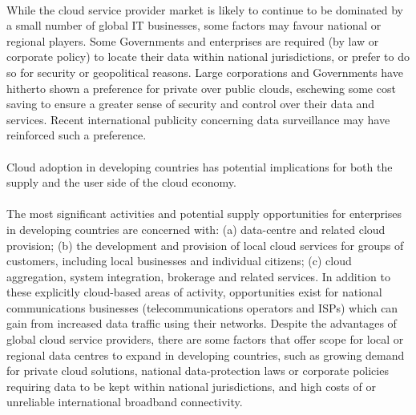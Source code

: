 \documentclass[a4paper, UTF8, 12pt]{article}
\begin{document}
\paragraph*{}
    While the cloud service provider market is likely to continue to be dominated by a small number of global IT businesses, some factors may favour national or regional players. Some Governments and enterprises are required (by law or corporate policy) to locate their data within national jurisdictions, or prefer to do so for security or geopolitical reasons. Large corporations and Governments have hitherto shown a preference for private over public clouds, eschewing some cost saving to ensure a greater sense of security and control over their data and services. Recent international publicity concerning data surveillance may have reinforced such a preference. 

\paragraph*{}
    \begin{bfseries}
        \large 
        Cloud adoption in developing countries has potential implications for both the supply and the user side of the cloud economy.
    \end{bfseries}

\paragraph*{}
    The most significant activities and potential supply opportunities for enterprises in developing countries are concerned with: (a) data-centre and related cloud provision; (b) the development and provision of local cloud services for groups of customers, including local businesses and individual citizens; (c) cloud aggregation, system integration, brokerage and related services. In addition to these explicitly cloud-based areas of activity, opportunities exist for national communications businesses (telecommunications operators and ISPs) which can gain from increased data traffic using their networks. Despite the advantages of global cloud service providers, there are some factors that offer scope for local or regional data centres to expand in developing countries, such as growing demand for private cloud solutions, national data-protection laws or corporate policies requiring data to be kept within national jurisdictions, and high costs of or unreliable international broadband connectivity. 
\end{document}
